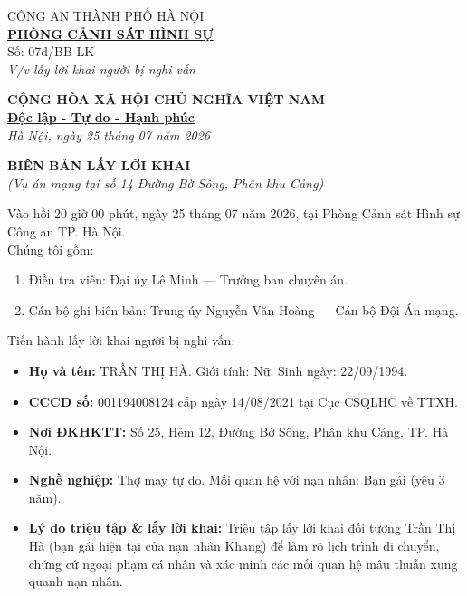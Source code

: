 \documentclass[12pt,a4paper]{article}
\begin{document}
\noindent
\begin{minipage}[t]{0.45\textwidth}
    \begin{center}
        \small
        CÔNG AN THÀNH PHỐ HÀ NỘI\\
        \textbf{\underline{PHÒNG CẢNH SÁT HÌNH SỰ}}\\[0.1cm]
        Số: 07d/BB-LK\\
        \textit{V/v lấy lời khai người bị nghi vấn}
    \end{center}
\end{minipage}
\hfill
\begin{minipage}[t]{0.52\textwidth}
    \begin{center}
        \small
        \textbf{CỘNG HÒA XÃ HỘI CHỦ NGHĨA VIỆT NAM}\\
        \textbf{\underline{Độc lập - Tự do - Hạnh phúc}}\\[0.1cm]
        \textit{Hà Nội, ngày 25 tháng 07 năm 2026}
    \end{center}
\end{minipage}

\vspace{0.6cm}

\begin{center}
    \textbf{\large BIÊN BẢN LẤY LỜI KHAI}\\
    \textit{(Vụ án mạng tại số 14 Đường Bờ Sông, Phân khu Cảng)}
\end{center}

\vspace{0.3cm}

\noindent Vào hồi 20 giờ 00 phút, ngày 25 tháng 07 năm 2026, tại Phòng Cảnh sát Hình sự Công an TP. Hà Nội.\\
Chúng tôi gồm:
\begin{enumerate}[label=\arabic*., leftmargin=1.5cm]
    \item Điều tra viên: Đại úy Lê Minh — Trưởng ban chuyên án.
    \item Cán bộ ghi biên bản: Trung úy Nguyễn Văn Hoàng — Cán bộ Đội Án mạng.
\end{enumerate}

\noindent Tiến hành lấy lời khai người bị nghi vấn:
\begin{itemize}[leftmargin=1.5cm]
    \item \textbf{Họ và tên:} TRẦN THỊ HÀ. Giới tính: Nữ. Sinh ngày: 22/09/1994.
    \item \textbf{CCCD số:} 001194008124 cấp ngày 14/08/2021 tại Cục CSQLHC về TTXH.
    \item \textbf{Nơi ĐKHKTT:} Số 25, Hẻm 12, Đường Bờ Sông, Phân khu Cảng, TP. Hà Nội.
    \item \textbf{Nghề nghiệp:} Thợ may tự do. Mối quan hệ với nạn nhân: Bạn gái (yêu 3 năm).
    \item \textbf{Lý do triệu tập \& lấy lời khai:} Triệu tập lấy lời khai đối tượng Trần Thị Hà (bạn gái hiện tại của nạn nhân Khang) để làm rõ lịch trình di chuyển, chứng cứ ngoại phạm cá nhân và xác minh các mối quan hệ mâu thuẫn xung quanh nạn nhân.
\end{itemize}
\end{document}
